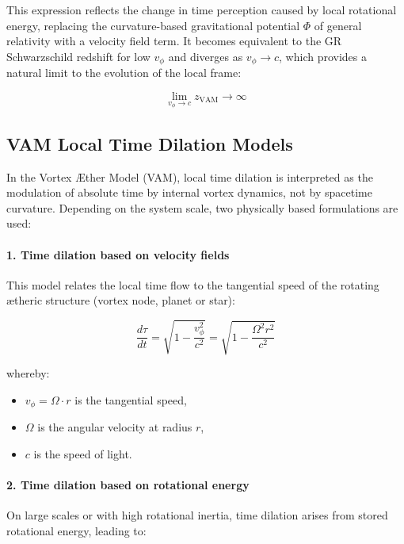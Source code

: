 This expression reflects the change in time perception caused by local rotational energy, replacing the curvature-based gravitational potential \( \Phi \) of general relativity with a velocity field term. It becomes equivalent to the GR Schwarzschild redshift for low \( v_\phi \) and diverges as \( v_\phi \rightarrow c \), which provides a natural limit to the evolution of the local frame:

\begin{equation}
    \lim_{v_\phi \to c} z_\text{VAM} \to \infty
\end{equation}

\subsection*{VAM Local Time Dilation Models}

In the Vortex Æther Model (VAM), local time dilation is interpreted as the modulation of absolute time by internal vortex dynamics, not by spacetime curvature. Depending on the system scale, two physically based formulations are used:

\paragraph{1. Time dilation based on velocity fields}

This model relates the local time flow to the tangential speed of the rotating ætheric structure (vortex node, planet or star):

\begin{equation}
    \frac{d\tau}{dt} =
    \sqrt{1 - \frac{v_\phi^2}{c^2}} =
    \sqrt{1 - \frac{\Omega^2 r^2}{c^2}}
\end{equation}

whereby:
\begin{itemize}
    \item \( v_\phi = \Omega \cdot r \) is the tangential speed,
    \item \( \Omega \) is the angular velocity at radius \( r \),
    \item \( c \) is the speed of light.
\end{itemize}

\paragraph{2. Time dilation based on rotational energy}

On large scales or with high rotational inertia, time dilation arises from stored rotational energy, leading to:

